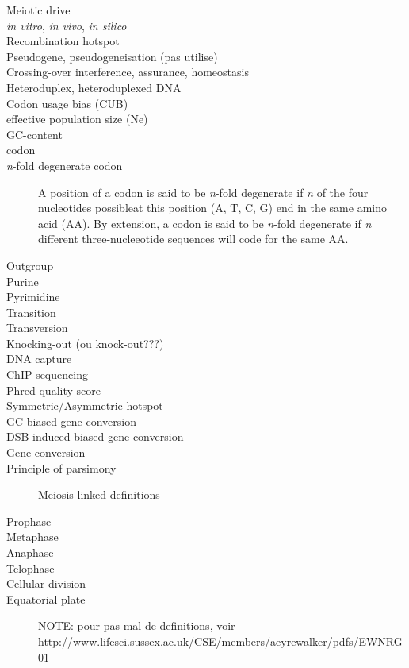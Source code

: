 \begin{alwayssingle}
\begin{description}
		\item[Meiotic drive]
		\item[\textit{in vitro}, \textit{in vivo}, \textit{in silico}]
		\item[Recombination hotspot]
		\item[Pseudogene, pseudogeneisation (pas utilise)]
		\item[Crossing-over interference, assurance, homeostasis]
		\item[Heteroduplex, heteroduplexed DNA]
		\item[Codon usage bias (CUB)]
		\item[effective population size (Ne)]
\item[GC-content]
\item[codon]
\item[\textit{n}-fold degenerate codon] A position of a codon is said to be \textit{n}-fold degenerate if \textit{n} of the four nucleotides possibleat this position (A, T, C, G) end in the same amino acid (AA). By extension, a codon is said to be \textit{n}-fold degenerate if \textit{n} different three-nucleeotide sequences will code for the same AA\@.
\item[Outgroup]
\item[Purine]
\item[Pyrimidine]
\item[Transition]
\item[Transversion]
\item[Knocking-out (ou knock-out???)]
\item[DNA capture]
\item[ChIP-sequencing]
\item[Phred quality score]
\item[Symmetric/Asymmetric hotspot]
\item[GC-biased gene conversion]
\item[DSB-induced biased gene conversion]
\item[Gene conversion]
\item[Principle of parsimony]

Meiosis-linked definitions
\item[Prophase]
\item[Metaphase]
\item[Anaphase]
\item[Telophase]
\item[Cellular division]
\item[Equatorial plate]


NOTE\@: pour pas mal de definitions, voir http://www.lifesci.sussex.ac.uk/CSE/members/aeyrewalker/pdfs/EWNRG01%


	\end{description}
\end{alwayssingle}
\mtcaddchapter{}


